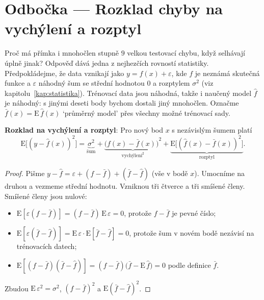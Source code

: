 \section{Odbočka --- Rozklad chyby na vychýlení a rozptyl}

Proč má přímka i mnohočlen stupně $9$ velkou testovací chybu, když selhávají úplně jinak? Odpověď dává jedna z nejhezčích rovností statistiky. Předpokládejme, že data vznikají jako $y = f(x) + \varepsilon$, kde $f$ je neznámá skutečná funkce a $\varepsilon$ náhodný šum se střední hodnotou $0$ a rozptylem $\sigma^2$ (viz kapitolu~\ref{kap:statistika}). Trénovací data jsou náhodná, takže i naučený model $\hat{f}$ je náhodný: s jinými deseti body bychom dostali jiný mnohočlen. Označme $\bar{f}(x) = \mathrm{E}\,\hat{f}(x)$ `průměrný model' přes všechny možné trénovací sady.

\begin{definitionbox}
  \textbf{Rozklad na vychýlení a rozptyl}: Pro nový bod $x$ s nezávislým šumem platí
  \begin{equation*}
    \mathrm{E}\big[{(y - \hat{f}(x))}^2\big] = \underbrace{\sigma^2}_{\text{šum}} + \underbrace{{\big(f(x) - \bar{f}(x)\big)}^2}_{\text{vychýlení}^2} + \underbrace{\mathrm{E}\big[{(\hat{f}(x) - \bar{f}(x))}^2\big]}_{\text{rozptyl}}.
  \end{equation*}
\end{definitionbox}

\begin{proof}
  Pišme $y - \hat{f} = \varepsilon + (f - \bar{f}) + (\bar{f} - \hat{f})$ (vše v bodě $x$). Umocníme na druhou a vezmeme střední hodnotu. Vzniknou tři čtverce a tři smíšené členy. Smíšené členy jsou nulové:
  \begin{itemize}
    \item $\mathrm{E}[\varepsilon(f - \bar{f})] = (f - \bar{f})\,\mathrm{E}\,\varepsilon = 0$, protože $f - \bar{f}$ je pevné číslo;
    \item $\mathrm{E}[\varepsilon(\bar{f} - \hat{f})] = \mathrm{E}\,\varepsilon\cdot\mathrm{E}[\bar{f} - \hat{f}] = 0$, protože šum v novém bodě nezávisí na trénovacích datech;
    \item $\mathrm{E}[(f - \bar{f})(\bar{f} - \hat{f})] = (f - \bar{f})\big(\bar{f} - \mathrm{E}\,\hat{f}\big) = 0$ podle definice $\bar{f}$.
  \end{itemize}
  Zbudou $\mathrm{E}\,\varepsilon^2 = \sigma^2$, ${(f - \bar{f})}^2$ a $\mathrm{E}{(\bar{f} - \hat{f})}^2$.
\end{proof}

